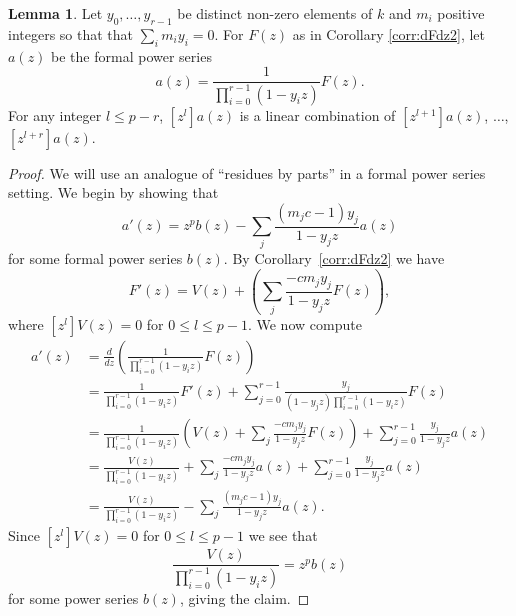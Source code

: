 \documentclass{amsart}
\numberwithin{equation}{section}
\theoremstyle{definition}
\newtheorem{lemma}[theorem]{Lemma}
\begin{document}
\begin{lemma} \label{lem:resbyparts}
Let $y_0,\dots,y_{r-1}$ be distinct non-zero elements of $k$ and $m_i$ positive integers so that that $\sum_i m_iy_i=0$.  For $F(z)$ as in Corollary \ref{corr:dFdz2}, let $a(z)$ be the formal power series
\[
a(z)=\frac{1}{\prod_{i=0}^{r-1}(1-y_iz)}F(z).
\]
For any integer $l \le p-r$, $[z^l]a(z)$ is a linear combination of $[z^{l+1}]a(z)$, $\ldots$, $[z^{l+r}]a(z)$.
\end{lemma}
\begin{proof} 
We will use an analogue of ``residues by parts'' in a formal power series setting.   We begin by showing that 
\[
a'(z)=z^pb(z)-\sum_j \frac{(m_jc-1)y_j}{1-y_jz}a(z)
\]
for some formal power series $b(z)$. By Corollary~\ref{corr:dFdz2} we have
\[
F'(z)=V(z)+\left(\sum_j \frac{-cm_jy_j}{1-y_jz}F(z)\right),
\]
where $[z^l]V(z)=0$ for $0 \le l \le p-1$. 
We now compute
\begin{align*}
a'(z)&=\frac{d}{dz}\left(\frac{1}{\prod_{i=0}^{r-1}(1-y_iz)}F(z)\right)\\
&=\frac{1}{\prod_{i=0}^{r-1}(1-y_iz)}F'(z)+\sum_{j=0}^{r-1}\frac{y_j}{(1-y_jz)\prod_{i=0}^{r-1}(1-y_iz)}F(z)\\
&=\frac{1}{\prod_{i=0}^{r-1}(1-y_iz)}\left(V(z)+\sum_j \frac{-cm_jy_j}{1-y_jz}F(z)\right)+\sum_{j=0}^{r-1}\frac{y_j}{1-y_jz}a(z)\\
&=\frac{V(z)}{\prod_{i=0}^{r-1}(1-y_iz)}+\sum_j \frac{-cm_jy_j}{1-y_jz}a(z)+\sum_{j=0}^{r-1}\frac{y_j}{1-y_jz}a(z)\\
&=\frac{V(z)}{\prod_{i=0}^{r-1}(1-y_iz)}-\sum_j \frac{(m_jc-1)y_j}{1-y_jz}a(z).
\end{align*}
Since $[z^l]V(z)=0$ for $0 \le l \le p-1$ we see that 
\[
\frac{V(z)}{\prod_{i=0}^{r-1}(1-y_iz)}=z^pb(z)
\]
for some power series $b(z)$, giving the claim.


\end{proof}
\end{document}
